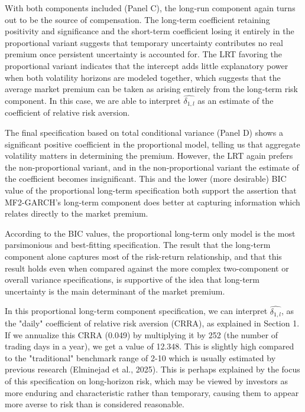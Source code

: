 \documentclass[12pt]{article}
\begin{document}
With both components included (Panel C), the long‑run component again turns out to be the source of compensation. The long-term coefficient retaining positivity and significance and the short-term coefficient losing it entirely in the proportional variant suggests that temporary uncertainty contributes no real premium once persistent uncertainty is accounted for. The LRT favoring the proportional variant indicates that the intercept adds little explanatory power when both volatility horizons are modeled together, which suggests that the average market premium can be taken as arising entirely from the long‑term risk component. In this case, we are able to interpret $\widehat{\delta_{1,l}}$ as an estimate of the coefficient of relative risk aversion.\par
The final specification based on total conditional variance (Panel D) shows a significant positive coefficient in the proportional model, telling us that aggregate volatility matters in determining the premium. However, the LRT again prefers the non-proportional variant, and in the non‑proportional variant the estimate of the coefficient becomes insignificant. This and the lower (more desirable) BIC value of the proportional long-term specification both support the assertion that MF2-GARCH's long-term component does better at capturing information which relates directly to the market premium.\par
According to the BIC values, the proportional long‑term only model is the most parsimonious and best‐fitting specification. The result that the long‑term component alone captures most of the risk-return relationship, and that this result holds even when compared against the more complex two-component or overall variance specifications, is supportive of the idea that long-term uncertainty is the main determinant of the market premium. \par
In this proportional long-term component specification, we can interpret $\widehat{\delta_{1,l}}$, as the "daily" coefficient of relative risk aversion (CRRA), as explained in Section 1. If we annualize this CRRA (0.049) by multiplying it by 252 (the number of trading days in a year), we get a value of 12.348. This is slightly high compared to the "traditional" benchmark range of 2-10 which is usually estimated by previous research (Elminejad et al., 2025). This is perhaps explained by the focus of this specification on long-horizon risk, which may be viewed by investors as more enduring and characteristic rather than temporary, causing them to appear more averse to risk than is considered reasonable.\par
\end{document}
